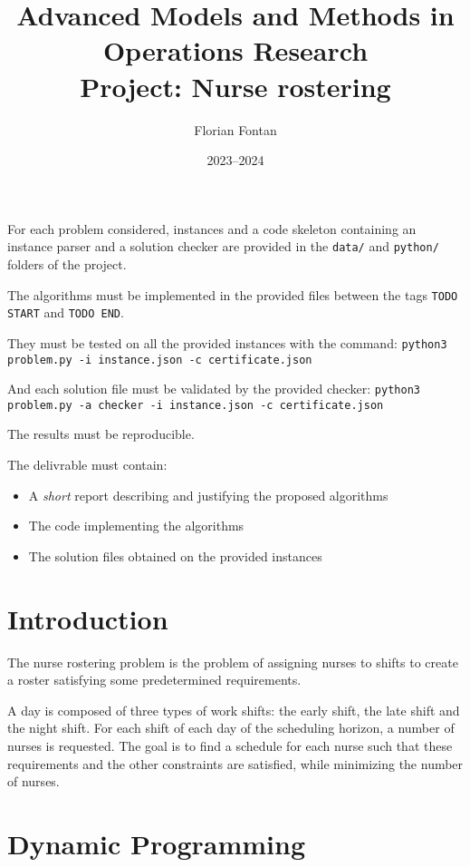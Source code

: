 \documentclass[a4paper,twocolumn]{article}
\author{Florian Fontan}
\title{Advanced Models and Methods in Operations Research \\ Project: Nurse rostering}
\date{2023--2024}
\begin{document}
\maketitle

For each problem considered, instances and a code skeleton containing an instance parser and a solution checker are provided in the \texttt{data/} and \texttt{python/} folders of the project.

The algorithms must be implemented in the provided files between the tags \texttt{TODO START} and \texttt{TODO END}.

They must be tested on all the provided instances with the command:
\texttt{python3 problem.py -i instance.json -c certificate.json}

And each solution file must be validated by the provided checker:
\texttt{python3 problem.py -a checker -i instance.json -c certificate.json}

The results must be reproducible.

\bigskip

The delivrable must contain:
\begin{itemize}
  \item A \emph{short} report describing and justifying the proposed algorithms
  \item The code implementing the algorithms
  \item The solution files obtained on the provided instances
\end{itemize}

\section*{Introduction}

The nurse rostering problem is the problem of assigning nurses to shifts to create a roster satisfying some predetermined requirements.

A day is composed of three types of work shifts: the early shift, the late shift and the night shift. For each shift of each day of the scheduling horizon, a number of nurses is requested. The goal is to find a schedule for each nurse such that these requirements and the other constraints are satisfied, while minimizing the number of nurses.

\section{Dynamic Programming}
\end{document}
